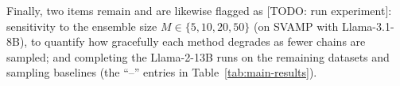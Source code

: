 \documentclass[11pt]{article}
\begin{document}
Finally, two items remain and are likewise flagged as [TODO: run experiment]:
sensitivity to the ensemble size $M \in \{5, 10, 20, 50\}$ (on SVAMP with
Llama-3.1-8B), to quantify how gracefully each method degrades as fewer chains
are sampled; and completing the Llama-2-13B runs on the remaining datasets and
sampling baselines (the ``--'' entries in Table~\ref{tab:main-results}).



\end{document}

